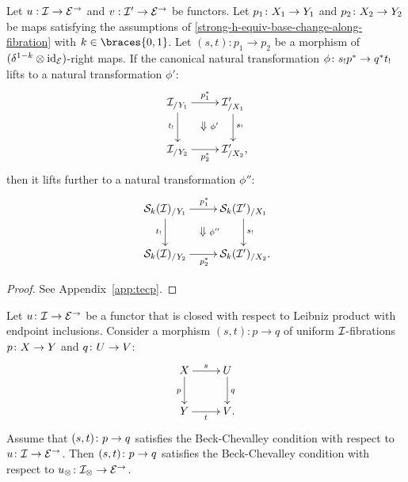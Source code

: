 \documentclass[reqno,10pt,a4paper,oneside,draft]{amsart}
\begin{document}
\begin{lemma} \label{strong-h-equiv-base-change-along-fibration-BC}
Let $u : \cal{I} \to \catE^\to$ and $v : \cal{I}' \to \catE^\to$ be functors.
Let $p_1 \co X_1 \to Y_1$ and $p_2 \co X_2 \to Y_2$ be maps satisfying the assumptions of \cref{strong-h-equiv-base-change-along-fibration} with $k \in \braces{0, 1}$.
Let $(s, t) : p_1 \to p_2$ be a morphism of $(\kcylinv \otimes \id_\catE)$-right maps.
If the canonical natural transformation $\phi \co s_! p^* \to q^* t_!$ lifts to a natural transformation $\phi'$:
\begin{equation*} %
\begin{gathered}
\xymatrix{
  \cal{I}_{/Y_1}
  \ar[r]^{p_1^*}
  \ar[d]_{t_!}
  \ar@{}[dr]|{\textstyle\Downarrow \rlap{$\labelstyle\phi'$}}
&
  \cal{I}_{/X_1}'
  \ar[d]^{s_!}
\\
  \cal{I}_{/Y_2}
  \ar[r]_{p_2^*}
&
  \cal{I}_{/X_2}'
\rlap{,}}
\end{gathered}
\end{equation*}
then it lifts further to a natural transformation $\phi''$:
\begin{equation*} %
\begin{gathered}
\xymatrix{
  \cal{S}_k(\cal{I})_{/Y_1}
  \ar[r]^{p_1^*}
  \ar[d]_{t_!}
  \ar@{}[dr]|{\textstyle\Downarrow \rlap{$\labelstyle\phi''$}}
&
  \cal{S}_k(\cal{I}')_{/X_1}
  \ar[d]^{s_!}
\\
  \cal{S}_k(\cal{I})_{/Y_2}
  \ar[r]_{p_2^*}
&
  \cal{S}_k(\cal{I}')_{/X_2}
\rlap{.}}
\end{gathered}
\end{equation*}
\end{lemma}

\begin{proof}
See Appendix~\ref{app:tecp}.
\end{proof}

\begin{theorem} \label{thm:beck-chevalley-unif}
Let $u \co \cal{I} \to \catE^\to$ be a functor that is closed with respect to Leibniz product with endpoint inclusions.
Consider a morphism $(s, t) : p \to q$ of uniform $\cal{I}$-fibrations $p \co X \to Y$ and $q \co U \to V$:
\[
\xymatrix{
  X \ar[r]^s \ar[d]_{p} & U \ar[d]^{q} \\
  Y \ar[r]_t & V
\rlap{.}}
\]
Assume that $(s,t) \co p \to q$ satisfies the Beck-Chevalley condition with respect to $u \co \cal{I} \to \catE^\to$.
Then $(s,t) \co p \to q$ satisfies the Beck-Chevalley condition with respect to $u_\otimes \co \cal{I}_\otimes \to \catE^\to$.\end{theorem}
\end{document}
